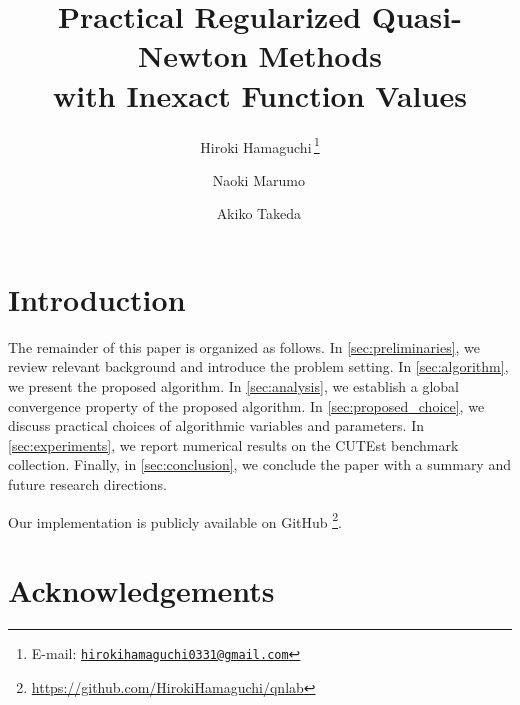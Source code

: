 \documentclass[11pt]{article}
\theoremstyle{definition}
\theoremstyle{remark}
\begin{document}
\title{Practical Regularized Quasi-Newton Methods\\
    with Inexact Function Values}

\author[1]{Hiroki Hamaguchi\,\footnote{E-mail: \href{mailto:hirokihamaguchi0331@gmail.com}{\nolinkurl{hirokihamaguchi0331@gmail.com}}}}
\author[1]{Naoki Marumo\,}
\author[1,2]{Akiko Takeda\,}


\maketitle

\begin{abstract}
    
\end{abstract}

\section{Introduction}\label{sec:introduction}



The remainder of this paper is organized as follows.
In \cref{sec:preliminaries}, we review relevant background and introduce the problem setting.
In \cref{sec:algorithm}, we present the proposed algorithm.
In \cref{sec:analysis}, we establish a global convergence property of the proposed algorithm.
In \cref{sec:proposed_choice}, we discuss practical choices of algorithmic variables and parameters.
In \cref{sec:experiments}, we report numerical results on the CUTEst benchmark collection.
Finally, in \cref{sec:conclusion}, we conclude the paper with a summary and future research directions.

Our implementation is publicly available on GitHub%
\footnote{\label{fn:ourGitHub}\url{https://github.com/HirokiHamaguchi/qnlab}}.

\providecommand{\resultsNoiseMainWidth}{0.7}
\providecommand{\resultsNoiseLegendWidth}{0.7}
\providecommand{\resultsAllPrecisionsSubfigWidth}{0.25}



\section*{Acknowledgements}
\end{document}
